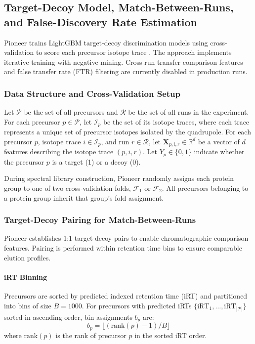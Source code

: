 \documentclass[pdflatex,sn-nature]{sn-jnl}
\begin{document}
\subsection{Target-Decoy Model, Match-Between-Runs, and False-Discovery Rate Estimation}\label{subsec2}

Pioneer trains LightGBM target-decoy discrimination models using cross-validation to score each precursor isotope trace \cite{LightGBM paper...}. The approach implements iterative training with negative mining. Cross-run transfer comparison features and false transfer rate (FTR) filtering are currently disabled in production runs.

\subsubsection{Data Structure and Cross-Validation Setup}

Let $\mathcal{P}$ be the set of all precursors and $\mathcal{R}$ be the set of all runs in the experiment. For each precursor $p \in \mathcal{P}$, let $\mathcal{I}_p$ be the set of its isotope traces, where each trace represents a unique set of precursor isotopes isolated by the quadrupole. For each precursor $p$, isotope trace $i \in \mathcal{I}_p$, and run $r \in \mathcal{R}$, let $\mathbf{X}_{p,i,r} \in \mathbb{R}^d$ be a vector of $d$ features describing the isotope trace $(p,i,r)$. Let $Y_p \in \{0,1\}$ indicate whether the precursor $p$ is a target (1) or a decoy (0).

During spectral library construction, Pioneer randomly assigns each protein group to one of two cross-validation folds, $\mathcal{F}_1$ or $\mathcal{F}_2$. All precursors belonging to a protein group inherit that group's fold assignment.

\subsubsection{Target-Decoy Pairing for Match-Between-Runs}

Pioneer establishes 1:1 target-decoy pairs to enable chromatographic comparison features. Pairing is performed within retention time bins to ensure comparable elution profiles.

\paragraph{iRT Binning} Precursors are sorted by predicted indexed retention time (iRT) and partitioned into bins of size $B = 1000$. For precursors with predicted iRTs $\{\text{iRT}_1, \ldots, \text{iRT}_{|\mathcal{P}|}\}$ sorted in ascending order, bin assignments $b_p$ are:
\begin{equation}
  b_p = \lfloor (\text{rank}(p) - 1) / B \rfloor
\end{equation}
where $\text{rank}(p)$ is the rank of precursor $p$ in the sorted iRT order.
\end{document}
